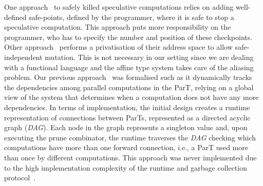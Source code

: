 \documentclass[sigplan]{acmart}
\begin{document}
One approach~\cite{DBLP:conf/ecoop/ImamS15,java-concurrency-in-practice}
to safely killed speculative computations
relies on adding well-defined safe-points, defined by the programmer,
where it is safe to stop a speculative computation.
This approach puts more responsibility on the programmer,
who has to specify the number and position of these checkpoints.
%
Other approach~\cite{DBLP:conf/oopsla/PylaRV11}
performs a privatisation of their address space
to allow safe-independent mutation. This is not necessary
in our setting since we are dealing with a functional language
and the affine type system takes care of the aliasing problem.
%
Our previous approach~\cite{DBLP:conf/coordination/Fernandez-Reyes16}
was formalised such as it dynamically tracks the dependencies
among parallel computations in the ParT, relying on a global view of the system
that determines when a computation does not have any more dependencies.
%
In terms of implementation, the initial design creates a runtime representation
of connections between ParTs, represented as a directed acyclic graph (\textit{DAG}).
Each node in the graph represents a singleton value and, upon executing the prune combinator,
the runtime traverses the \textit{DAG} checking which computations have more than one
forward connection, i.e., a ParT used more than once by different computations. 
This approach was never implemented due to the high
implementation complexity of the runtime
and garbage collection protocol~\cite{DBLP:conf/oopsla/ClebschD13}.



\end{document}
